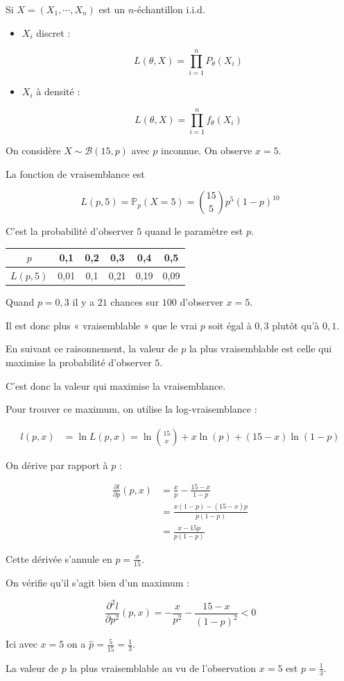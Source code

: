 \begin{remarque}
Si $X=(X_1,\cdots,X_n)$ est un $n$-échantillon i.i.d.

\begin{itemize}
\item $X_i$ discret :

$$
L(\theta,X) = \prod_{i=1}^{n} P_\theta (X_i)
$$
\item $X_i$ à densité :

$$
L(\theta,X) = \prod_{i=1}^{n} f_\theta(X_i)
$$
\end{itemize}
\end{remarque}

\begin{exemple}
On considère $X \sim \mathcal{B}(15,p)$ avec $p$ inconnue. On observe $x=5$.

La fonction de vraisemblance est

$$
L(p,5) = \mathbb{P}_p (X=5) = \binom{15}{5} p^5 (1-p)^{10}
$$

C'est la probabilité d'observer $5$ quand le paramètre est $p$.

\begin{center}
\begin{tabular}{|c|c|c|c|c|c|}
\hline
$p$ & 0,1 & 0,2 & 0,3 & 0,4 & 0,5 \\
\hline
$L(p,5)$ & 0,01 & 0,1 & 0,21 & 0,19 & 0,09 \\
\hline
\end{tabular}
\end{center}

Quand $p=0,3$ il y a $21$ chances sur $100$ d'observer $x=5$.

Il est donc plus « vraisemblable » que le vrai $p$ soit égal à $0,3$ plutôt qu'à $0,1$.

En suivant ce raisonnement, la valeur de $p$ la plus vraisemblable est celle qui maximise la probabilité d'observer $5$.

C'est donc la valeur qui maximise la vraisemblance.

Pour trouver ce maximum, on utilise la log-vraisemblance :

\begin{align*}
l(p,x) &= \ln L(p,x) = \ln \binom{15}{x} + x\ln(p) + (15-x)\ln(1-p)
\end{align*}

On dérive par rapport à $p$ :

\begin{align*}
\frac{\partial l}{\partial p}(p,x)
&= \frac{x}{p} - \frac{15-x}{1-p}\\
&= \frac{x(1-p) - (15-x)p}{p(1-p)}\\
&= \frac{x-15p}{p(1-p)}
\end{align*}

Cette dérivée s'annule en $p=\frac{x}{15}$.

On vérifie qu'il s'agit bien d'un maximum :

$$
\frac{\partial^2 l}{\partial p^2}(p,x) = -\frac{x}{p^2} - \frac{15-x}{(1-p)^2} < 0
$$

Ici avec $x=5$ on a $\hat{p}=\frac{5}{15}=\frac{1}{3}$.

La valeur de $p$ la plus vraisemblable au vu de l'observation $x=5$ est $p=\frac{1}{3}$.
\end{exemple}
